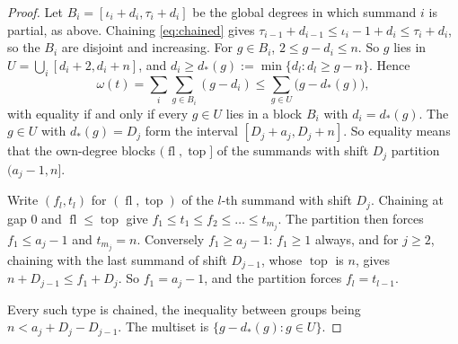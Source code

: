 \documentclass[11pt, a4paper, abstract=yes]{scrartcl}
\theoremstyle{definition}
\theoremstyle{remark}
\theoremstyle{plain}
\theoremstyle{remark}
\theoremstyle{plain}
\newcommand{\tp}{\operatorname{top}}
\newcommand{\fl}{\operatorname{fl}}
\begin{document}
\begin{proof}
Let \(B_i=[\iota_i+d_i,\tau_i+d_i]\) be the global degrees in which summand \(i\) is partial, as
above. Chaining \eqref{eq:chained} gives \(\tau_{i-1}+d_{i-1}\le\iota_i-1+d_i\le\tau_i+d_i\), so the \(B_i\) are
disjoint and increasing. For \(g\in B_i\), \(2\le g-d_i\le n\). So \(g\) lies in
\(U=\bigcup_i[d_i+2,d_i+n]\), and \(d_i\ge d_*(g):=\min\lbrace d_l:d_l\ge g-n\rbrace\). Hence
\[
  \omega(t)=\sum_i\sum_{g\in B_i}(g-d_i)\le\sum_{g\in U}\bigl(g-d_*(g)\bigr),
\]
with equality if and only if every \(g\in U\) lies in a block \(B_i\) with \(d_i=d_*(g)\). The
\(g\in U\) with \(d_*(g)=D_j\) form the interval \([D_j+a_j,D_j+n]\). So equality means that the
own-degree blocks \((\fl,\tp]\) of the summands with shift \(D_j\) partition \((a_j-1,n]\).

Write \((f_l,t_l)\) for \((\fl,\tp)\) of the \(l\)-th summand with shift \(D_j\). Chaining at gap
\(0\) and \(\fl\le\tp\) give \(f_1\le t_1\le f_2\le\dots\le t_{m_j}\). The partition then forces
\(f_1\le a_j-1\) and \(t_{m_j}=n\). Conversely \(f_1\ge a_j-1\): \(f_1\ge1\) always, and for
\(j\ge2\), chaining with the last summand of shift \(D_{j-1}\), whose \(\tp\) is \(n\), gives
\(n+D_{j-1}\le f_1+D_j\). So \(f_1=a_j-1\), and the partition forces \(f_l=t_{l-1}\).

Every such type is chained, the inequality between groups being \(n<a_j+D_j-D_{j-1}\). The
multiset is \(\lbrace g-d_*(g):g\in U\rbrace\).
\end{proof}
\end{document}
